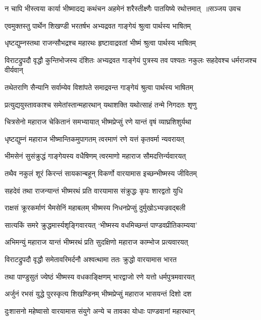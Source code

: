 \threelineshloka
{न चापि भीस्त्वया कार्या भीष्मादद्य कथंचन}
{अहमेनं शरैस्तीक्ष्णैः पातयिष्ये रथोत्तमात् ॥सञ्जय उवच}
{}


\twolineshloka
{एवमुक्तस्तु पार्थेन शिखण्डी भरतर्षभ}
{अभ्यद्रवत गाङ्गेयं श्रुत्वा पार्थस्य भाषितम्}


\twolineshloka
{धृष्टद्युम्नस्तथा राजन्सौभद्रश्च महारथः}
{हृष्टावाद्रवतां भीष्मं श्रुत्वा पार्थस्य भाषितम्}


\threelineshloka
{विराटद्रुपदौ वृद्धौ कुन्तिभोजस्य दंशितः}
{अभ्यद्रवत गाङ्गेयं पुत्रस्य तव पश्यतः}
{नकुलः सहदेवश्च धर्मराजश्च वीर्यवान्}


\twolineshloka
{तथेतराणि सैन्यानि सर्वाम्येव विशांपते}
{समाद्रवन्त गाङ्गेयं श्रुत्वा पार्थस्य भाषितम्}


\twolineshloka
{प्रत्युद्ययुस्तावकाश्च समेतांस्तान्महारथान्}
{यथाशक्ति यथोत्साहं तन्मे निगदतः शृणु}


\twolineshloka
{चित्रसेनो महाराज चेकितानं समभ्यायात्}
{भीष्मप्रेप्सुं रणे यान्तं वृषं व्याघ्रशिशुर्यथा}


\twolineshloka
{धृष्टद्युम्नं महाराज भीष्मान्तिकमुपागतम्}
{त्वरमाणं रणे यत्तं कृतवर्मा न्यवरायत्}


\twolineshloka
{भीमसेनं सुसंक्रुद्धं गाङ्गेयस्य वधैषिणम्}
{त्वरमाणो महाराज सौमदत्तिर्न्यवारयत्}


\twolineshloka
{तथैव नकुलं शूरं किरन्तं सायकान्बहून्}
{विकर्णो वारयामास इच्छन्भीष्मस्य जीवितम्}


\twolineshloka
{सहदेवं तथा राजन्यान्तं भीष्मरथं प्रति}
{वारयामास संक्रुद्धः कृपः शारद्वतो युधि}


\twolineshloka
{राक्षसं क्रूरकर्माणं भैमसेनिं महाबलम्}
{भीष्मस्य निधनप्रेप्सुं दुर्मुखोऽभ्यज्रवद्बली}


\twolineshloka
{सात्यकिं समरे क्रुद्धमार्स्यशृङ्गिवारयत्}
{`भीष्मस्य वधमिच्छन्तं पाण्डवप्रीतिकाम्यया'}


\twolineshloka
{अभिमन्युं महाराज यान्तं भीष्मरथं प्रति}
{सुदक्षिणो महाराज काम्भोज प्रत्यवारयत्}


\twolineshloka
{विराटद्रुपदौ वृद्धौ समेतावरिमर्दनौ}
{अश्वत्थामा ततः क्रुद्धो वारयामास भारत}


\twolineshloka
{तथा पाण्डुसुतं ज्येष्ठं भीष्मस्य वधकाङ्क्षिणम्}
{भारद्वाजो रणे यत्तो धर्मपुत्रमवारयत्}


\twolineshloka
{अर्जुनं रभसं युद्धे पुरस्कृत्य शिखण्डिनम्}
{भीष्मप्रेप्सुं महाराज भासयन्तं दिशो दश}


\twolineshloka
{दुःशासनो महेष्वासो वारयामास संयुगे}
{अन्ये च तावका योधाः पाण्डवानां महारथान्}


